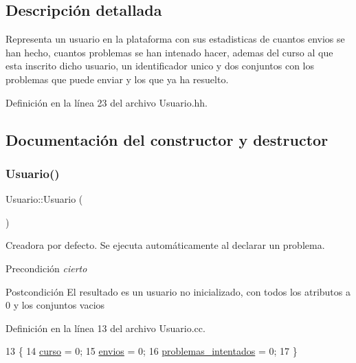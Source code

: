 \subsection{Descripción detallada}
Representa un usuario en la plataforma con sus estadisticas de cuantos envios se han hecho, cuantos problemas se han intenado hacer, ademas del curso al que esta inscrito dicho usuario, un identificador unico y dos conjuntos con los problemas que puede enviar y los que ya ha resuelto. 

Definición en la línea 23 del archivo Usuario.\+hh.



\subsection{Documentación del constructor y destructor}
\mbox{\label{class_usuario_aa85a5371a098dfba5449140d9b8a472f}} 
\subsubsection{\texorpdfstring{Usuario()}{Usuario()}\hspace{0.1cm}{\footnotesize\ttfamily [1/2]}}
{\footnotesize\ttfamily Usuario\+::\+Usuario (\begin{DoxyParamCaption}{ }\end{DoxyParamCaption})}



Creadora por defecto. Se ejecuta automáticamente al declarar un problema. 

\begin{DoxyPrecond}{Precondición}
{\itshape cierto} 
\end{DoxyPrecond}
\begin{DoxyPostcond}{Postcondición}
El resultado es un usuario no inicializado, con todos los atributos a 0 y los conjuntos vacios 
\end{DoxyPostcond}


Definición en la línea 13 del archivo Usuario.\+cc.


\begin{DoxyCode}
13                  \{
14   \mbox{\hyperlink{class_usuario_aa767fe2d1198f2c97791073bc55803e7}{curso}} = 0;
15   \mbox{\hyperlink{class_usuario_a485a741c0646e6414bd6cf669a77fc9c}{envios}} = 0;
16   \mbox{\hyperlink{class_usuario_a5484a08ce9aeabef98074c738f58b00a}{problemas\_intentados}} = 0;
17 \}
\end{DoxyCode}
\mbox{\label{class_usuario_adbc2bd125ed21ba9e091e3593e31f4cd}} 
